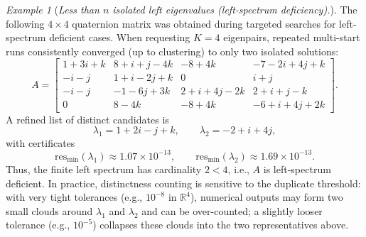 \documentclass[preprint,12pt]{elsarticle}  %
\theoremstyle{definition}
\theoremstyle{definition}
\theoremstyle{definition}
\theoremstyle{definition}
\theoremstyle{definition}
\theoremstyle{remark}
\theoremstyle{remark}
\newtheorem{Ex}{Example}
\theoremstyle{remark}
\DeclareRobustCommand{\i}{\ensuremath{\mathbf{i}}}
\DeclareRobustCommand{\j}{\ensuremath{\mathbf{j}}}
\DeclareRobustCommand{\k}{\ensuremath{\mathbf{k}}}
\def\i{i}\def\j{j}\def\k{k}%
\newcommand{\RR}{\mathbb{R}}
\begin{document}
\begin{Ex}[\emph{Less than $n$ isolated left eigenvalues (left-spectrum deficiency).}]
\label{ex:byprod_4x4_two}
The following $4\times4$ quaternion matrix was obtained during targeted searches for left-spectrum deficient cases.
When requesting $K=4$ eigenpairs, repeated multi-start runs consistently converged (up to clustering) to only two isolated solutions:
\[
A=
\begin{bmatrix}
1 + 3\i + \k & 8 + \i + \j - 4\k & -8 + 4\k & -7 - 2\i + 4\j + \k \\
-\i - \j & 1 + \i - 2\j + \k & 0 & \i + \j \\
-\i - \j & -1 - 6\j + 3\k & 2 + \i + 4\j - 2\k & 2 + \i + \j - \k \\
0 & 8 - 4\k & -8 + 4\k & -6 + \i + 4\j + 2\k
\end{bmatrix}.
\]
A refined list of distinct candidates is
\[
\lambda_1 = 1 + 2\i - \j + \k,
\qquad
\lambda_2 = -2 + \i + 4\j,
\]
with certificates
\[
\mathrm{res}_{\min}(\lambda_1)\approx 1.07\times10^{-13},
\qquad
\mathrm{res}_{\min}(\lambda_2)\approx 1.69\times10^{-13}.
\]
Thus, the finite left spectrum has cardinality $2<4$, i.e., $A$ is left-spectrum deficient.
In practice, distinctness counting is sensitive to the duplicate threshold: with very tight tolerances (e.g., $10^{-8}$ in $\RR^4$), numerical outputs may form two small clouds around $\lambda_1$ and $\lambda_2$ and can be over-counted; a slightly looser tolerance (e.g., $10^{-5}$) collapses these clouds into the two representatives above.
\end{Ex}
\end{document}
